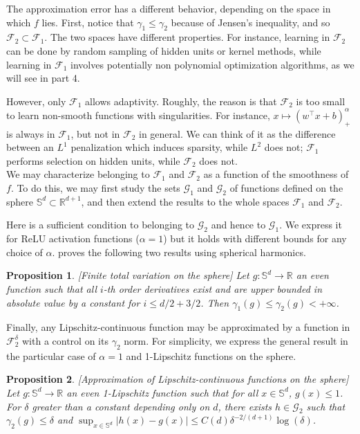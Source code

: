 \documentclass[a4paper, 11pt]{scrartcl}
\newtheorem{proposition}{Proposition}[section]
\begin{document}
{The approximation error has a different behavior, depending on the space in which $f$ lies. First, notice that $\gamma_1 \leq \gamma_2$ because of Jensen's inequality, and so $\mathcal{F}_2 \subset \mathcal{F}_1$. The two spaces have different properties. For instance, learning in $\mathcal{F}_2$ can be done by random sampling of hidden units or kernel methods, while learning in $\mathcal{F}_1$ involves potentially non polynomial optimization algorithms, as we will see in part 4.

However, only $\mathcal{F}_1$ allows adaptivity. Roughly, the reason is that $\mathcal{F}_2$ is too small to learn non-smooth functions with singularities. For instance, $x\mapsto (w^\top x+b)^\alpha_+$ is always in $\mathcal{F}_1$, but not in $\mathcal{F}_2$ in general. We can think of it as the difference between an $L^1$ penalization which induces sparsity, while $L^2$ does not; $\mathcal{F}_1$ performs selection on hidden units, while $\mathcal{F}_2$ does not.\\


We may characterize belonging to $\mathcal{F}_1$ and $\mathcal{F}_2$ as a function of the smoothness of $f$. To do this, we may first study the sets $\mathcal{G}_1$ and $\mathcal{G}_2$ of functions defined on the sphere $\mathbb{S}^d \subset \mathbb{R}^{d+1}$, and then extend the results to the whole spaces $\mathcal{F}_1$ and $\mathcal{F}_2$.

Here is a sufficient condition to belonging to $\mathcal{G}_2$ and hence to $\mathcal{G}_1$. We express it for ReLU activation functions ($\alpha=1$) but it holds with different bounds for any choice of $\alpha$. \cite{bach2017breaking} proves the following two results using spherical harmonics.

\begin{proposition}
\emph{[Finite total variation on the sphere]} Let $g : \mathbb{S}^d \rightarrow \mathbb{R}$ an even function such that all $i$-th order derivatives exist and are upper bounded in absolute value by a constant for $i \leq d/2 + 3/2$. Then $\gamma_1(g) \leq \gamma_2(g) < +\infty$.
\end{proposition}

Finally, any Lipschitz-continuous function may be approximated by a function in $\mathcal{F}_2^\delta$ with a control on its $\gamma_2$ norm. For simplicity, we express the general result in the particular case of $\alpha = 1$ and 1-Lipschitz functions on the sphere.

\begin{proposition}
\emph{[Approximation of Lipschitz-continuous functions on the sphere]} Let $g : \mathbb{S}^d \rightarrow \mathbb{R}$ an even 1-Lipschitz function such that for all $x \in  \mathbb{S}^d$, $g(x) \leq 1$. For $\delta$ greater than a constant depending only on $d$, there exists $h\in \mathcal{G}_2$ such that $\gamma_2(g) \leq \delta$ and $\sup_{x \in  \mathbb{S}^d} |h(x) - g(x)| \leq C(d) \delta^{-2/(d+1)} \log(\delta)$.
\end{proposition}

}
\end{document}
